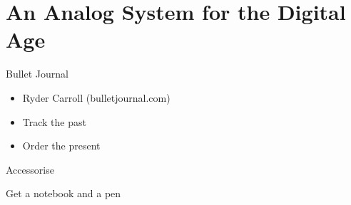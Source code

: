 \documentclass[aspectratio=169]{beamer}
\begin{document}
    \section{An Analog System for the Digital Age}

    {
    \begin{frame}{Bullet Journal}
        \begin{itemize}
            \item Ryder Carroll (bulletjournal.com)
            \item \alert{Track the past}
            \item Order the present
        \end{itemize}
    \end{frame}
    }

    {
    \begin{frame}{Accessorise}
        \begin{titlebox}
            \centering
            Get a notebook and a pen
        \end{titlebox}
    \end{frame}
    }
\end{document}
